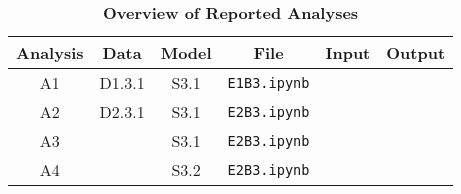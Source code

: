 \documentclass[10pt]{article}
\begin{document}
\begin{table}[!ht]
\caption{
\bf{Overview of Reported Analyses}}
\begin{tabular}{|c|c|c|c|c|c|}
\hline
Analysis & Data & Model & File & Input & Output\\
\hline
A1 & D1.3.1 & S3.1 & \texttt{E1B3.ipynb} & & \\
A2 & D2.3.1 & S3.1 & \texttt{E2B3.ipynb} & & \\
A3 & \centering{D2.3.1 D2.3.2 D2.3.3} & S3.1 & \texttt{E2B3.ipynb} & & \\
A4 & \centering{D2.3.1 D2.3.2 D2.3.3} & S3.2 & \texttt{E2B3.ipynb} & & \\
\hline
\end{tabular}
\begin{flushleft}
\end{flushleft}
\label{tab:ip}
\end{table}
\end{document}
